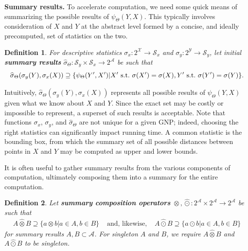 \documentclass{article}
\newtheorem{definition} {Definition}
\newcommand{\killspace}{\vspace{-0.08in}}
\newcommand{\GNP}[1][\psi]{{#1}_{\Theta}}
\newcommand{\sigmahat}{\mathbin{\widehat{\sigma}}}
\newcommand{\otimeshat}{\mathbin{\widehat{\otimes}}}
\newcommand{\odothat}{\mathbin{\widehat{\odot}}}
\newcommand{\st}{{\rm~s.t.~}}
\begin{document}

{\bf Summary results.}
To accelerate computation, we need some quick means of summarizing the possible results of $\GNP(Y,X)$.
This typically involves consideration of $X$ and $Y$ at the abstract level formed by a concise, and ideally precomputed, set of statistics on the two.
\begin{definition}
  For descriptive statistics $\sigma_x \colon 2^{\mathcal{X}} \to
  \mathcal{S}_x$ and $\sigma_y \colon 2^{\mathcal{Y}} \to
  \mathcal{S}_y$, let initial {\bf summary results} $\GNP[\sigmahat]
  \colon \mathcal{S}_y \times \mathcal{S}_x \to 2^\mathcal{A}$ be such
  that
  \[
  \GNP[\sigmahat](\sigma_y(Y),\sigma_x(X)) \supseteq \{\GNP(Y',X') | X' \st \sigma(X') = \sigma(X), Y' \st \sigma(Y') = \sigma(Y)\}.
  \]
\end{definition}
\killspace
\noindent Intuitively, $\GNP[\sigmahat](\sigma_y(Y),\sigma_x(X))$ represents all possible results of $\GNP(Y,X)$ given what we know about $X$ and $Y$.
Since the exact set may be costly or impossible to represent, a superset of such results is acceptable.
Note that functions $\sigma_x$, $\sigma_y$, and $\GNP[\sigmahat]$ are not unique for a given GNP; indeed, choosing the right statistics can significantly impact running time.
A common statistic is the bounding box, from which the summary set of all possible distances between points in $X$ and $Y$ may be computed as upper and lower bounds.

It is often useful to gather summary results from the various components of computation, ultimately composing them into a summary for the entire computation.
\begin{definition}
  Let {\bf summary composition operators} $\otimeshat, \odothat \colon
  2^{\mathcal{A}} \times 2^{\mathcal{A}} \to 2^{\mathcal{A}}$ be such
  that
  \[ \begin{array}{rcl}
    A \otimeshat B \supseteq \{a \otimes b | a \in A, b \in B\} & \mbox{ and, likewise, } & A \odothat B \supseteq \{a \odot b | a \in A, b \in B\}
  \end{array} \]
  for summary results $A,B \subset \mathcal{A}$.  For singleton $A$
  and $B$, we require $A \otimeshat B$ and $A \odothat B$ to be
  singleton.
\end{definition}
\killspace
\end{document}
